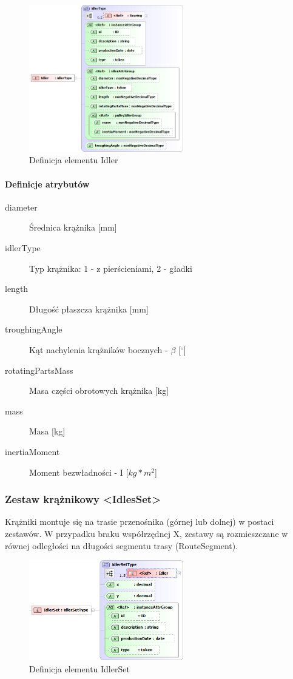 \documentclass[12pt,a4paper]{article}
\begin{document}
\begin{figure}[h]
  \centering
  \includegraphics[width=0.6\textwidth]{png/liquid/Idler}
  \caption{Definicja elementu Idler}
  \label{fig:idler-xsd}
\end{figure}

\paragraph{Definicje atrybutów}
\begin{description}
\item[diameter] Średnica krążnika [mm]
\item[idlerType] Typ krążnika: 1 - z pierścieniami, 2 - gładki
\item[length] Długość płaszcza krążnika [mm]
\item[troughingAngle] Kąt nachylenia krążników bocznych - $\beta$ [$^\circ$]
\item[rotatingPartsMass] Masa części obrotowych krążnika [kg]
\item[mass] Masa [kg]
\item[inertiaMoment] Moment bezwładności - I [$kg*m^2$]
\end{description}


\subsubsection{Zestaw krążnikowy <IdlesSet>}
Krążniki montuje się na trasie przenośnika (górnej lub dolnej) w postaci zestawów. W przypadku
braku współrzędnej X, zestawy są rozmieszczane w równej odległości na długości segmentu trasy
(RouteSegment).

\begin{figure}[h]
  \centering
  \includegraphics[width=0.6\textwidth]{png/liquid/IdlerSet}
  \caption{Definicja elementu IdlerSet}
  \label{fig:idlerSet-xsd}
\end{figure}
\end{document}
